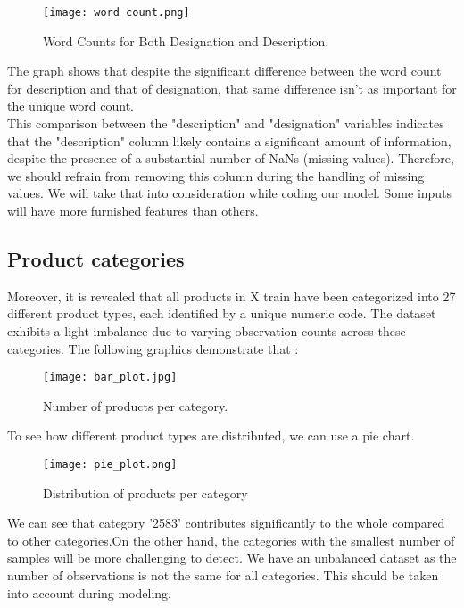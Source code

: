 \begin{figure}[h]
	\centering
	\texttt{[image: word count.png]}
	\caption{Word Counts for Both Designation and Description.}
	\label{fig:label}
\end{figure}



The graph shows that despite the significant difference between the word count for description and that of designation, that same difference isn't as important for the unique word count. \\
This comparison between the "description" and "designation" variables indicates that the "description" column likely contains a significant amount of information, despite the presence of a substantial number of NaNs (missing values). Therefore, we should refrain from removing this column during the handling of missing values. We will take that into consideration while coding our model. Some inputs will have more furnished features than others. \\

\subsection{Product categories}
Moreover, it is revealed that all products in X train have been categorized into 27 different product types, each identified by a unique numeric code. The dataset exhibits a light imbalance due to varying observation counts across these categories.
The following graphics demonstrate that : \\



\begin{figure}[h]
	\centering
	\texttt{[image: bar\_plot.jpg]}
	\caption{Number of products per category.}
	\label{fig:label}
\end{figure}


To see how different product types are distributed, we can use a pie chart. \\

\begin{figure}[h]
	\centering  
	\texttt{[image: pie\_plot.png]}
	\caption{Distribution of products per category}
	\label{fig:label}
\end{figure}


We can see that category '2583' contributes significantly to the whole compared to other categories.On the other hand, the categories with the smallest number of samples will be more challenging to detect. We have an unbalanced dataset as the number of observations is not the same for all categories. This should be taken into account during modeling.

